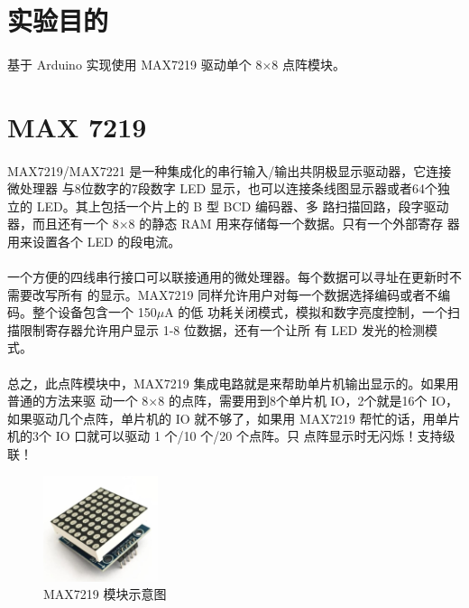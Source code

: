 \documentclass[UTF8, oneside]{ctexbook}
\begin{document}
\section{实验目的}
\paragraph{}
基于 Arduino 实现使用 MAX7219 驱动单个 8$\times$8 点阵模块。

\section{MAX 7219}
\paragraph{}
MAX7219/MAX7221 是一种集成化的串行输入/输出共阴极显示驱动器，它连接微处理器
与8位数字的7段数字 LED 显示，也可以连接条线图显示器或者64个独立的 LED。其上包括一个片上的 B 型 BCD 编码器、多
路扫描回路，段字驱动器，而且还有一个 8$\times$8 的静态 RAM 用来存储每一个数据。只有一个外部寄存
器用来设置各个 LED 的段电流。

\paragraph{}
一个方便的四线串行接口可以联接通用的微处理器。每个数据可以寻址在更新时不需要改写所有
的显示。MAX7219 同样允许用户对每一个数据选择编码或者不编码。整个设备包含一个 150$\mu$A 的低
功耗关闭模式，模拟和数字亮度控制，一个扫描限制寄存器允许用户显示 1-8 位数据，还有一个让所
有 LED 发光的检测模式。

\paragraph{}
总之，此点阵模块中，MAX7219 集成电路就是来帮助单片机输出显示的。如果用普通的方法来驱
动一个 8$\times$8 的点阵，需要用到8个单片机 IO，2个就是16个 IO，如果驱动几个点阵，单片机的 IO 
就不够了，如果用 MAX7219 帮忙的话，用单片机的3个 IO 口就可以驱动 1 个/10 个/20 个点阵。只
点阵显示时无闪烁！支持级联！

\begin{figure}[h]
    \centering
    \includegraphics[width=0.3\textwidth]{./result/sensor/2/sensor.png}
    \caption{MAX7219 模块示意图}
    \label{2_sensor}
\end{figure}
\end{document}
